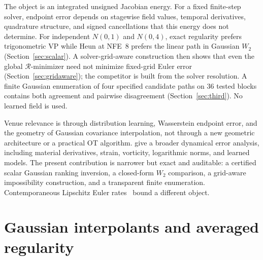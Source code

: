 \documentclass{article}
\newcommand{\wtwo}{W_2}
\newcommand{\cR}{\mathcal{R}}
\begin{document}
The object is an integrated unsigned Jacobian energy. For a fixed
finite-step solver, endpoint error depends on stagewise field values,
temporal derivatives, quadrature structure, and signed cancellations
that this energy does not determine. For independent $N(0,1)$ and
$N(0,4)$, exact regularity prefers trigonometric VP while Heun at
NFE~$8$ prefers the linear path in Gaussian $\wtwo$
(Section~\ref{sec:scalar}). A solver-grid-aware construction then shows
that even the global $\cR$-minimizer need not minimize fixed-grid Euler
error (Section~\ref{sec:gridaware}); the competitor is built from the
solver resolution. A finite Gaussian enumeration of four specified
candidate paths on $36$ tested blocks contains both agreement and
pairwise disagreement (Section~\ref{sec:third}). No learned field is
used.

Venue relevance is through distribution learning, Wasserstein endpoint
error, and the geometry of Gaussian covariance interpolation, not
through a new geometric architecture or a practical OT algorithm.
\citet{tao2026strain} give a broader dynamical error analysis, including
material derivatives, strain, vorticity, logarithmic norms, and learned
models. The present contribution is narrower but exact and auditable: a
certified scalar Gaussian ranking inversion, a closed-form $\wtwo$
comparison, a grid-aware impossibility construction, and a transparent
finite enumeration. Contemporaneous Lipschitz Euler
rates~\citep{stephanovitch2026lipschitz} bound a different object.

\section{Gaussian interpolants and averaged regularity}
\label{sec:setup}
\end{document}
